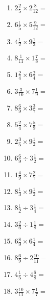 \documentclass[12pt]{article}
\begin{document}
\begin{enumerate}
\item \large $ 2 \frac{2}{5} \times 2 \frac{8}{12} = $ \vspace{1.6cm}
\item \large $ 6 \frac{1}{5} \times 5 \frac{9}{12} = $ \vspace{1.6cm}
\item \large $ 4 \frac{1}{2} \times 9 \frac{1}{3} = $ \vspace{1.6cm}
\item \large $ 8 \frac{1}{11} \times 1 \frac{7}{8} = $ \vspace{1.6cm}
\newpage
\item \large $ 1 \frac{2}{4} \times 6 \frac{2}{4} = $ \vspace{1.6cm}
\item \large $ 3 \frac{3}{10} \times 7 \frac{1}{9} = $ \vspace{1.6cm}
\item \large $ 8 \frac{6}{9} \times 3 \frac{3}{7} = $ \vspace{1.6cm}
\item \large $ 5 \frac{2}{4} \times 7 \frac{5}{9} = $ \vspace{1.6cm}
\item \large $ 2 \frac{3}{5} \times 9 \frac{1}{2} = $ \vspace{1.6cm}
\item \large $ 6 \frac{6}{9} \div 3 \frac{1}{2} = $ \vspace{1.6cm}
\item \large $ 1 \frac{4}{9} \times 7 \frac{2}{7} = $ \vspace{1.6cm}
\item \large $ 8 \frac{1}{3} \times 9 \frac{1}{2} = $ \vspace{1.6cm}
\item \large $ 8 \frac{1}{2} \div 3 \frac{1}{4} = $ \vspace{1.6cm}
\item \large $ 3 \frac{2}{6} \div 1 \frac{1}{8} = $ \vspace{1.6cm}
\newpage
\item \large $ 6 \frac{8}{9} \times 6 \frac{1}{4} = $ \vspace{1.6cm}
\item \large $ 8 \frac{6}{9} \div 2 \frac{10}{11} = $ \vspace{1.6cm}
\item \large $ 4 \frac{1}{5} \div 4 \frac{6}{8} = $ \vspace{1.6cm}
\item \large $ 3 \frac{10}{11} \times 7 \frac{1}{7} = $ \vspace{1.6cm}

\end{enumerate}
\end{document}
